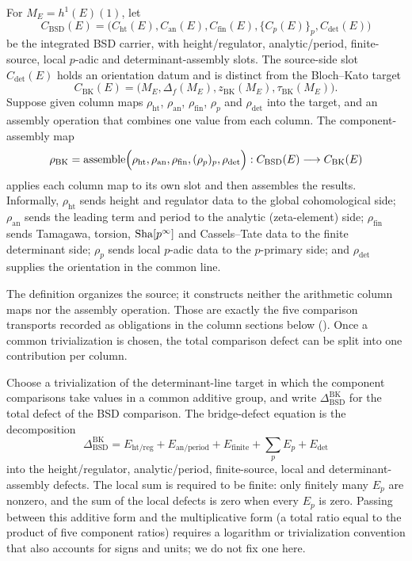 \begin{definition}
\label{def:apparatus:bk-component-map}
For $M_E=h^1(E)(1)$, let
\[
  C_{\mathrm{BSD}}(E)
  =
  \bigl(C_{\mathrm{ht}}(E),C_{\mathrm{an}}(E),C_{\mathrm{fin}}(E),
  \{C_p(E)\}_p,C_{\det}(E)\bigr)
\]
be the integrated BSD carrier, with height/regulator, analytic/period,
finite-source, local $p$-adic and determinant-assembly slots.  The
source-side slot $C_{\det}(E)$ holds an orientation datum and is distinct
from the Bloch--Kato target
\[
  C_{\mathrm{BK}}(E)
  =
  \bigl(M_E,\Delta_f(M_E),z_{\mathrm{BK}}(M_E),\tau_{\mathrm{BK}}(M_E)\bigr).
\]
Suppose given column maps $\rho_{\mathrm{ht}}$, $\rho_{\mathrm{an}}$,
$\rho_{\mathrm{fin}}$, $\rho_p$ and $\rho_{\det}$ into the target, and an
assembly operation that combines one value from each column.  The
component-assembly map
\[
  \rho_{\mathrm{BK}}
  =
  \operatorname{assemble}\Bigl(
  \rho_{\mathrm{ht}},\rho_{\mathrm{an}},\rho_{\mathrm{fin}},
  (\rho_p)_p,\rho_{\det}\Bigr)
  :
  C_{\mathrm{BSD}}(E)\longrightarrow C_{\mathrm{BK}}(E)
\]
applies each column map to its own slot and then assembles the results.
Informally, $\rho_{\mathrm{ht}}$ sends height and regulator data to the
global cohomological side; $\rho_{\mathrm{an}}$ sends the leading term and
period to the analytic (zeta-element) side; $\rho_{\mathrm{fin}}$ sends
Tamagawa, torsion, $\operatorname{Sha}[p^\infty]$ and Cassels--Tate data to the finite
determinant side; $\rho_p$ sends local $p$-adic data to the $p$-primary
side; and $\rho_{\det}$ supplies the orientation in the common line.
\end{definition}

The definition organizes the source; it constructs neither the arithmetic
column maps nor the assembly operation.  Those are exactly the five
comparison transports recorded as obligations in the column sections below
().
Once a common trivialization is chosen, the total comparison defect can be
split into one contribution per column.

\begin{definition}
\label{def:apparatus:bridge-defect-equation}
Choose a trivialization of the determinant-line target in which the
component comparisons take values in a common additive group, and write
$\Delta_{\mathrm{BSD}}^{\mathrm{BK}}$ for the total defect of the BSD
comparison.  The bridge-defect equation is the decomposition
\[
  \Delta_{\mathrm{BSD}}^{\mathrm{BK}}
  =
  E_{\mathrm{ht/reg}}
  +E_{\mathrm{an/period}}
  +E_{\mathrm{finite}}
  +\sum_p E_p
  +E_{\det}
\]
into the height/regulator, analytic/period, finite-source, local and
determinant-assembly defects.  The local sum is required to be finite:
only finitely many $E_p$ are nonzero, and the sum of the local defects is
zero when every $E_p$ is zero.  Passing between this additive form and
the multiplicative form (a total ratio equal to the product of five
component ratios) requires a logarithm or trivialization convention that
also accounts for signs and units; we do not fix one here.
\end{definition}

